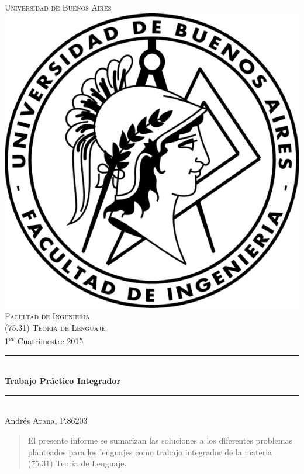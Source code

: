 \documentclass[12pt]{article}
\begin{document}
\begin{titlepage}

\newcommand{\HRule}{\rule{\linewidth}{0.5mm}}

\center

\textsc{\LARGE Universidad de Buenos Aires}\\[1.5cm]

\includegraphics{docs/images/logo-fiuba.png}\\[1cm]

\textsc{\Large Facultad de Ingeniería}\\[0.5cm]
\textsc{\large (75.31) Teoría de Lenguaje}\\[0.5cm]
{\large 1\textsuperscript{er} Cuatrimestre 2015}\\[0.5cm]

\HRule \\[0.4cm]
{ \huge \bfseries Trabajo Práctico Integrador}\\[0.4cm]
\HRule \\[1.5cm]

\large Andrés Arana, P.86203

\vfill

\end{titlepage}

\begin{abstract}

El presente informe se sumarizan las soluciones a los diferentes problemas
planteados para los lenguajes como trabajo integrador de la materia (75.31)
Teoría de Lenguaje.

\end{abstract}
\end{document}
